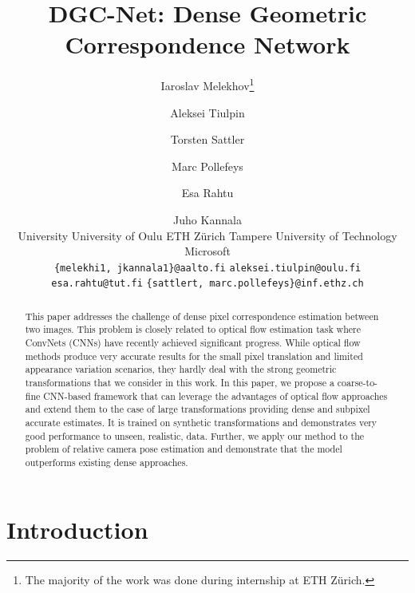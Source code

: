 \documentclass[10pt,twocolumn,letterpaper]{article}
\author{
    Iaroslav Melekhov\thanks{The majority of the work was done during internship at ETH Z{\"u}rich.} \\
\and
    Aleksei Tiulpin \\
\and
    Torsten Sattler \\
\and
    Marc Pollefeys \\
\and
    Esa Rahtu\\
\and
    Juho Kannala\\
    \smallAalto University \hspace{1pt} University of Oulu \hspace{1pt} ETH Z{\"u}rich \hspace{1pt} Tampere University of Technology \hspace{1pt} Microsoft\\
    \small\texttt{\{melekhi1, jkannala1\}@aalto.fi} \hspace{2.5pt} \texttt{aleksei.tiulpin@oulu.fi}\\
    \small\texttt{esa.rahtu@tut.fi} \hspace{2.5pt} \texttt{\{sattlert, marc.pollefeys\}@inf.ethz.ch}\\
}
\begin{document}
\title{DGC-Net: Dense Geometric Correspondence Network}

\maketitle


\begin{abstract}
This paper addresses the challenge of dense pixel correspondence estimation between two images. This problem is closely related to optical flow estimation task where ConvNets (CNNs) have recently achieved significant progress. While optical flow methods produce very accurate results for the small pixel translation and limited appearance variation scenarios, they hardly deal with the strong geometric transformations that we consider in this work. In this paper, we propose a coarse-to-fine CNN-based framework that can leverage the advantages of optical flow approaches and extend them to the case of large transformations providing dense and subpixel accurate estimates. It is trained on synthetic transformations and demonstrates very good performance to unseen, realistic, data. Further, we apply our method to the problem of relative camera pose estimation and demonstrate that the model outperforms existing dense approaches. \end{abstract}

\section{Introduction}
\end{document}
